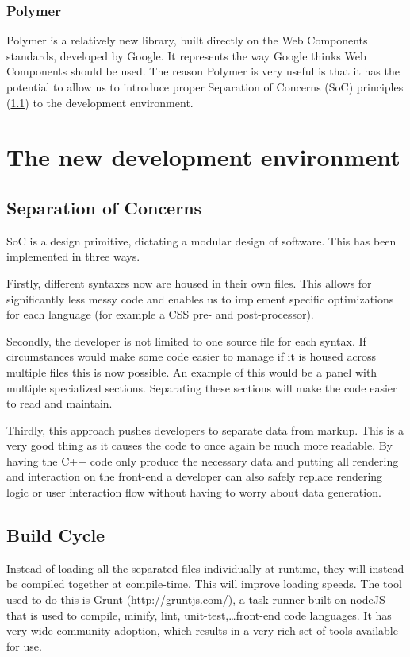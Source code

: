 \documentclass[journal,compsoc,a4paper]{IEEEtran}
\begin{document}
\subsubsection{Polymer}
Polymer is a relatively new library, built directly on the Web Components
standards, developed by Google. It represents the way Google thinks Web
Components should be used.
The reason Polymer is very useful is that it has the potential
to allow us to introduce proper Separation of Concerns (SoC) principles
(\ref{Separation of Concerns}) to the development environment.

\section{The new development environment}
\subsection{Separation of Concerns}
\label{Separation of Concerns}
SoC is a design primitive, dictating a modular design of software. This has
been implemented in three ways.

Firstly, different syntaxes now are housed in their own files. This allows for
significantly less messy code and enables us to implement specific optimizations
for each language (for example a CSS pre- and post-processor).

Secondly, the developer is not limited to one source file for each syntax. If
circumstances would make some code easier to manage if it is housed across
multiple files this is now possible. An example of this would be a panel with
multiple specialized sections. Separating these sections will make the code
easier to read and maintain.

Thirdly, this approach pushes developers to separate data from markup. This is
a very good thing as it causes the code to once again be much more readable.
By having the C++ code only produce the necessary data and putting all rendering
and interaction on the front-end a developer can also safely replace rendering logic or
user interaction flow without having to worry about data generation.

\subsection{Build Cycle}
Instead of loading all the separated files individually at runtime, they will
instead be compiled together at compile-time. This will improve loading speeds.
The tool used to do this is Grunt
(http://gruntjs.com/), a task runner built on nodeJS that is used to compile,
minify, lint, unit-test,\ldots front-end code languages.
It has very wide community adoption, which results in a very rich set of tools
available for use.
\end{document}
